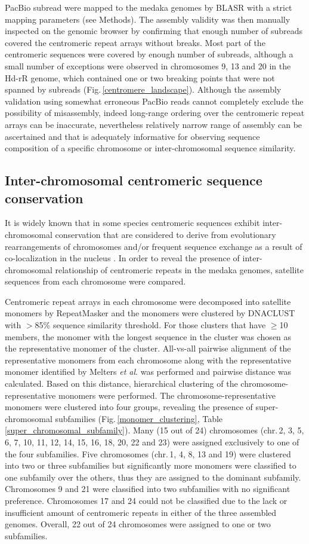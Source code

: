   PacBio subread were mapped to the medaka genomes by BLASR \cite{Chaisson2012} with a strict mapping parameters (see Methods). The assembly validity was then manually inspected on the genomic browser by confirming that enough number of subreads covered the centromeric repeat arrays without breaks. Most part of the centromeric sequences were covered by enough number of subreads, although a small number of exceptions were observed in chromosomes 9, 13 and 20 in the Hd-rR genome, which contained one or two breaking points that were not spanned by subreads (Fig.\,\ref{centromere_landscape}). Although the assembly validation using somewhat erroneous PacBio reads cannot completely exclude the possibility of misassembly, indeed long-range ordering over the centromeric repeat arrays can be inaccurate, nevertheless relatively narrow range of assembly can be ascertained and that is adequately informative for observing sequence composition of a specific chromosome or inter-chromosomal sequence similarity.


\subsection*{Inter-chromosomal centromeric sequence conservation}
  It is widely known that in some species centromeric sequences exhibit inter-chromosomal conservation that are considered to derive from evolutionary rearrangements of chromosomes and/or frequent sequence exchange as a result of co-localization in the nucleus \cite{Willard1991}. In order to reveal the presence of inter-chromosomal relationship of centromeric repeats in the medaka genomes, satellite sequences from each chromosome were compared.

  Centromeric repeat arrays in each chromosome were decomposed into satellite monomers by RepeatMasker and the monomers were clustered by DNACLUST \cite{Ghodsi2011} with $>$85\% sequence similarity threshold. For those clusters that have $\geq$10 members, the monomer with the longest sequence in the cluster was chosen as the representative monomer of the cluster. All-vs-all pairwise alignment of the representative monomers from each chromosome along with the representative monomer identified by Melters \textit{et al}. was performed and pairwise distance was calculated. Based on this distance, hierarchical clustering of the chromosome-representative monomers were performed. The chromosome-representative monomers were clustered into four groups, revealing the presence of super-chromosomal subfamilies (Fig.\,\ref{monomer_clustering}, Table\,\ref{super_chromosomal_subfamily}). Many (15 out of 24) chromosomes (chr.\,2, 3, 5, 6, 7, 10, 11, 12, 14, 15, 16, 18, 20, 22 and 23) were assigned exclusively to one of the four subfamilies. Five chromosomes (chr.\,1, 4, 8, 13 and 19) were clustered into two or three subfamilies but significantly more monomers were classified to one subfamily over the others, thus they are assigned to the dominant subfamily. Chromosomes 9 and 21 were classified into two subfamilies with no significant preference. Chromosomes 17 and 24 could not be classified due to the lack or insufficient amount of centromeric repeats in either of the three assembled genomes. Overall, 22 out of 24 chromosomes were assigned to one or two subfamilies.

